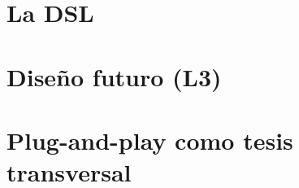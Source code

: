 \documentclass[11pt,openany]{book}
\begin{document}
\part{La DSL}





\part{Diseño futuro (L3)}




\part{Plug-and-play como tesis transversal}



\appendix




\end{document}
